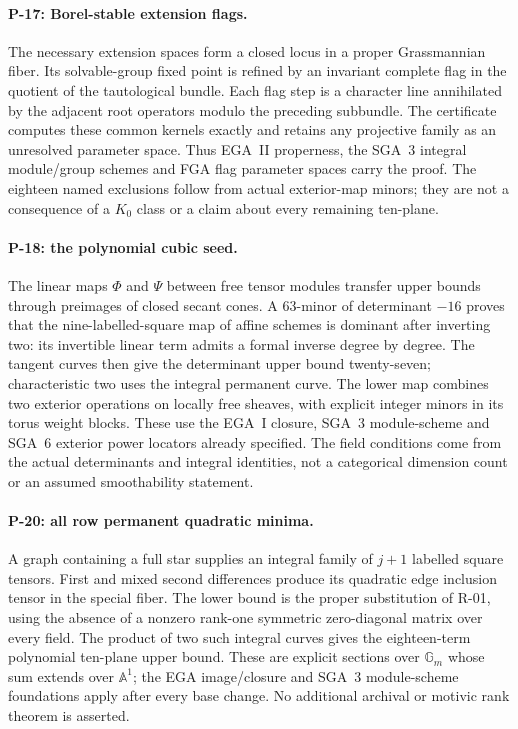 \paragraph{P-17: Borel-stable extension flags.}
The necessary extension spaces form a closed locus in a proper
Grassmannian fiber. Its solvable-group fixed point is refined by
an invariant complete flag in the quotient of the tautological
bundle. Each flag step is a character line annihilated by the
adjacent root operators modulo the preceding subbundle. The
certificate computes these common kernels exactly and retains
any projective family as an unresolved parameter space. Thus
EGA~II properness, the SGA~3 integral module/group schemes and
FGA flag parameter spaces carry the proof. The eighteen named
exclusions follow from actual exterior-map minors; they are
not a consequence of a $K_0$ class or a claim about every
remaining ten-plane.

\paragraph{P-18: the polynomial cubic seed.}
The linear maps $\Phi$ and $\Psi$ between free tensor modules
transfer upper bounds through preimages of closed secant cones.
A $63$-minor of determinant $-16$ proves that the nine-labelled-square
map of affine schemes is dominant after inverting two: its
invertible linear term admits a formal inverse degree by degree.
The tangent curves then give the determinant upper bound twenty-seven;
characteristic two uses the integral permanent curve. The lower
map combines two exterior operations on locally free sheaves,
with explicit integer minors in its torus weight blocks.
These use the EGA~I closure, SGA~3 module-scheme and SGA~6 exterior
power locators already specified. The field conditions come from
the actual determinants and integral identities, not a categorical
dimension count or an assumed smoothability statement.

\paragraph{P-20: all row permanent quadratic minima.}
A graph containing a full star supplies an integral family of
$j+1$ labelled square tensors. First and mixed second differences
produce its quadratic edge inclusion tensor in the special fiber.
The lower bound is the proper substitution of R-01, using the
absence of a nonzero rank-one symmetric zero-diagonal matrix
over every field. The product of two such integral curves gives
the eighteen-term polynomial ten-plane upper bound. These are
explicit sections over $\mathbb G_m$ whose sum extends over
$\mathbb A^1$; the EGA image/closure and SGA~3 module-scheme
foundations apply after every base change. No additional
archival or motivic rank theorem is asserted.

